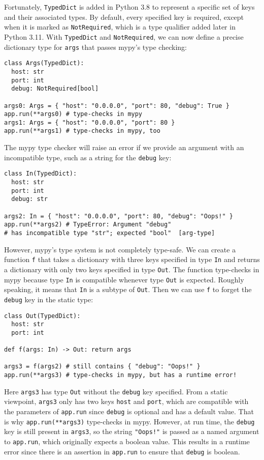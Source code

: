 Fortunately, \lstinline{TypedDict} is added in Python 3.8 to represent a
specific set of keys and their associated types. By default, every specified key
is required, except when it is marked as \lstinline{NotRequired}, which is a
type qualifier added later in Python 3.11. With \lstinline{TypedDict} and
\lstinline{NotRequired}, we can now define a precise dictionary type for
\lstinline{args} that passes mypy's type checking:
\begin{lstlisting}[language={[3]Python}]
class Args(TypedDict):
  host: str
  port: int
  debug: NotRequired[bool]

args0: Args = { "host": "0.0.0.0", "port": 80, "debug": True }
app.run(**args0) # type-checks in mypy
args1: Args = { "host": "0.0.0.0", "port": 80 }
app.run(**args1) # type-checks in mypy, too
\end{lstlisting}
The mypy type checker will raise an error if we provide an argument with an
incompatible type, such as a string for the \lstinline{debug} key:
\begin{lstlisting}[language={[3]Python}]
class In(TypedDict):
  host: str
  port: int
  debug: str

args2: In = { "host": "0.0.0.0", "port": 80, "debug": "Oops!" }
app.run(**args2) # TypeError: Argument "debug"
# has incompatible type "str"; expected "bool"  [arg-type]
\end{lstlisting}
However, mypy's type system is not completely type-safe. We can create a
function \lstinline{f} that takes a dictionary with three keys specified in type
\lstinline{In} and returns a dictionary with only two keys specified in type
\lstinline{Out}. The function type-checks in mypy because type \lstinline{In} is
compatible whenever type \lstinline{Out} is expected. Roughly speaking, it means
that \lstinline{In} is a subtype of \lstinline{Out}. Then we can use
\lstinline{f} to forget the \lstinline{debug} key in the static type:
\begin{lstlisting}[language={[3]Python}]
class Out(TypedDict):
  host: str
  port: int

def f(args: In) -> Out: return args

args3 = f(args2) # still contains { "debug": "Oops!" }
app.run(**args3) # type-checks in mypy, but has a runtime error!
\end{lstlisting}
Here \lstinline{args3} has type \lstinline{Out} without the \lstinline{debug}
key specified. From a static viewpoint, \lstinline{args3} only has two keys
\lstinline{host} and \lstinline{port}, which are compatible with the parameters
of \lstinline{app.run} since \lstinline{debug} is optional and has a default
value. That is why \lstinline{app.run(**args3)} type-checks in mypy. However, at
run time, the \lstinline{debug} key is still present in \lstinline{args3}, so
the string \lstinline{"Oops!"} is passed as a named argument to
\lstinline{app.run}, which originally expects a boolean value. This results in a
runtime error since there is an assertion in \lstinline{app.run} to ensure that
\lstinline{debug} is boolean.

